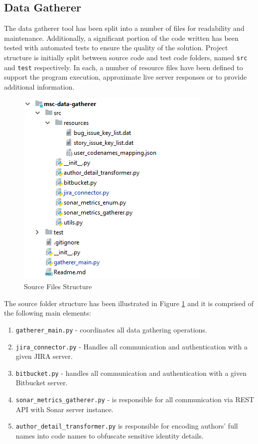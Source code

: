\subsection{Data Gatherer}\label{sec:impl-data-gatherer}
The data gatherer tool has been split into a number of files for readability and maintenance. Additionally, a significant portion of the code written has been tested with automated tests to ensure the quality of the solution. Project structure is initially split between source code and test code folders, named \texttt{src} and \texttt{test} respectively. In each, a number of resource files have been defined to support the program execution, approximate live server responses or to provide additional information.

\begin{figure}[!h]
    \centering
    \includegraphics{Figures/impl_src_folder_files.png}
    \caption{Source Files Structure}
    \label{fig:impl-data-gatherer-source-files}
\end{figure}

The source folder structure has been illustrated in Figure \ref{fig:impl-data-gatherer-source-files} and it is comprised of the following main elements:
\begin{enumerate}
    \item \texttt{gatherer\_main.py} - coordinates all data gathering operations. 
    \item\label{lst:impl.item:jira} \texttt{jira\_connector.py} - Handles all communication and authentication with a given JIRA server.
    \item\label{lst:impl.item:bitbucket} \texttt{bitbucket.py} - handles all communication and authentication with a given Bitbucket server.
    \item\label{lst:impl.item:sonar-metrics-gatherer} \texttt{sonar\_metrics\_gatherer.py} - is responsible for all communication via REST API with Sonar server instance.
    \item\label{lst:impl.item:author-encoder} \texttt{author\_detail\_transformer.py} is responsible for encoding authors' full names into code names to obfuscate sensitive identity details. 
\end{enumerate}

